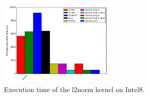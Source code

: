 \documentclass[10pt, preprint]{sigplanconf}
\begin{document}
\begin{figure}[t]
\centering
\includegraphics[width=0.5\textwidth]{l2norm_intel8.png}
\caption{Execution time of the l2norm kernel on Intel8.}
\label{fig:l2norm_intel8}
\end{figure}

\begin{table}


\end{table}
\end{document}
